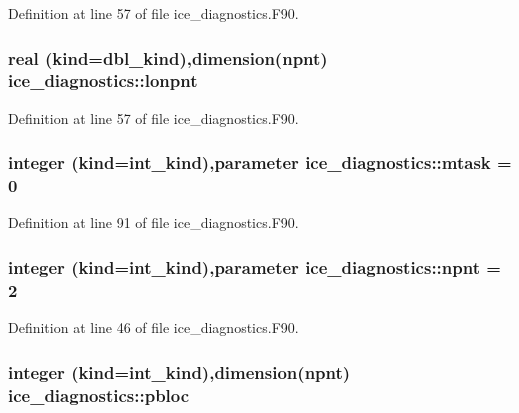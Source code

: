 Definition at line 57 of file ice\_\-diagnostics.F90.\hypertarget{namespaceice__diagnostics_ac674492c3212f73e6ab2a93e41774c0b}{
\subsubsection[{lonpnt}]{\setlength{\rightskip}{0pt plus 5cm}real (kind=dbl\_\-kind),dimension({\bf npnt}) {\bf ice\_\-diagnostics::lonpnt}}}
\label{namespaceice__diagnostics_ac674492c3212f73e6ab2a93e41774c0b}


Definition at line 57 of file ice\_\-diagnostics.F90.\hypertarget{namespaceice__diagnostics_ad2f5352613b9b67de6d460e59a6b8bc4}{
\subsubsection[{mtask}]{\setlength{\rightskip}{0pt plus 5cm}integer (kind=int\_\-kind),parameter {\bf ice\_\-diagnostics::mtask} = 0}}
\label{namespaceice__diagnostics_ad2f5352613b9b67de6d460e59a6b8bc4}


Definition at line 91 of file ice\_\-diagnostics.F90.\hypertarget{namespaceice__diagnostics_aab9ed37bb736e9c83d4bf276c8010dc2}{
\subsubsection[{npnt}]{\setlength{\rightskip}{0pt plus 5cm}integer (kind=int\_\-kind),parameter {\bf ice\_\-diagnostics::npnt} = 2}}
\label{namespaceice__diagnostics_aab9ed37bb736e9c83d4bf276c8010dc2}


Definition at line 46 of file ice\_\-diagnostics.F90.\hypertarget{namespaceice__diagnostics_afb89b35222316a961a8e669d4c3a8e9a}{
\subsubsection[{pbloc}]{\setlength{\rightskip}{0pt plus 5cm}integer (kind=int\_\-kind),dimension({\bf npnt}) {\bf ice\_\-diagnostics::pbloc}}}
\label{namespaceice__diagnostics_afb89b35222316a961a8e669d4c3a8e9a}


